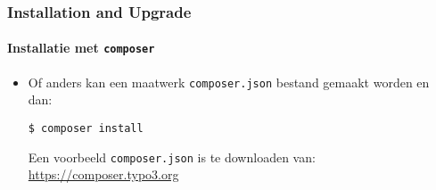 
\begin{frame}[fragile]
	\frametitle{Installation and Upgrade}
	\framesubtitle{Installatie met \texttt{composer}}

	\begin{itemize}
	\framesubtitle{Installatie met \texttt{composer}}

			\begin{lstlisting}
$ cd /var/www/site/
$ composer create-project typo3/cms-base-distribution CmsBaseDistribution ^9
			\end{lstlisting}

		\item Of anders kan een maatwerk \texttt{composer.json} bestand gemaakt worden en dan:

			\begin{lstlisting}
$ composer install
			\end{lstlisting}

			Een voorbeeld \texttt{composer.json} is te downloaden van:\newline
			\smaller
				\href{https://composer.typo3.org}{https://composer.typo3.org}
			\normalsize

	\end{itemize}
\end{frame}

